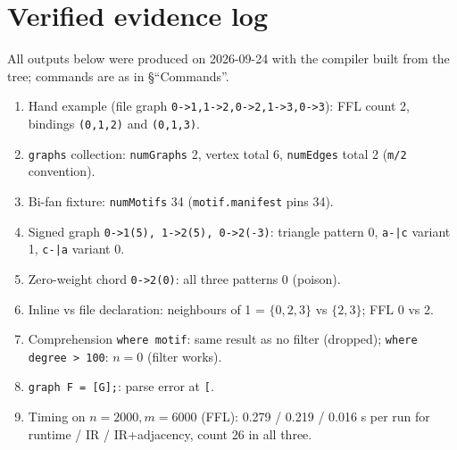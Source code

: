 \documentclass[11pt,a4paper]{article}
\newcommand{\code}[1]{\texttt{#1}}
\newcommand{\file}[1]{\texttt{#1}}
\begin{document}
\section{Verified evidence log}

All outputs below were produced on 2026-09-24 with the compiler built from the
tree; commands are as in \S{}``Commands''.

\begin{enumerate}
  \item Hand example (file graph \code{0->1,1->2,0->2,1->3,0->3}): FFL count 2,
        bindings \code{(0,1,2)} and \code{(0,1,3)}.
  \item \code{graphs} collection: \code{numGraphs} 2, vertex total 6,
        \code{numEdges} total 2 (\code{m/2} convention).
  \item Bi-fan fixture: \code{numMotifs} 34 (\file{motif.manifest} pins 34).
  \item Signed graph \code{0->1(5), 1->2(5), 0->2(-3)}: triangle pattern 0,
        \code{a-|c} variant 1, \code{c-|a} variant 0.
  \item Zero-weight chord \code{0->2(0)}: all three patterns 0 (poison).
  \item Inline vs file declaration: neighbours of 1 = $\{0,2,3\}$ vs $\{2,3\}$;
        FFL 0 vs 2.
  \item Comprehension \code{where motif}: same result as no filter (dropped);
        \code{where degree > 100}: $n=0$ (filter works).
  \item \code{graph F = [G];}: parse error at \code{[}.
  \item Timing on $n{=}2000,m{=}6000$ (FFL): 0.279 / 0.219 / 0.016 s per run for
        runtime / IR / IR+adjacency, count 26 in all three.
\end{enumerate}
\end{document}
